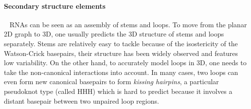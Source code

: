 \documentclass{bioinfo}
\begin{document}
\paragraph{Secondary structure elements}~ RNAs can be seen as an assembly of stems and loops. To move from the planar 2D graph to 3D, one usually predicts the 3D structure of stems and loops separately. Stems are relatively easy to tackle because of the isostericity of the Watson-Crick basepairs, their structure has been widely observed and features low variability. On the other hand, to accurately model loops in 3D, one needs to take the non-canonical interactions into account. In many cases, two loops can even form new canonical basepairs to form \textit{kissing hairpins}, a particular pseudoknot type (called HHH) which is hard to predict because it involves a distant basepair between two unpaired loop regions.
\end{document}
